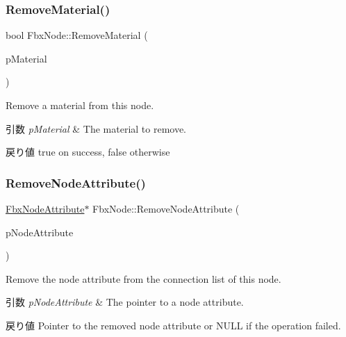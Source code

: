 \subsubsection{\texorpdfstring{Remove\+Material()}{RemoveMaterial()}}
{\footnotesize\ttfamily bool Fbx\+Node\+::\+Remove\+Material (\begin{DoxyParamCaption}\item[{\hyperlink{class_fbx_surface_material}{Fbx\+Surface\+Material} $\ast$}]{p\+Material }\end{DoxyParamCaption})}

Remove a material from this node. 
\begin{DoxyParams}{引数}
{\em p\+Material} & The material to remove. \\
\hline
\end{DoxyParams}
\begin{DoxyReturn}{戻り値}
true on success, false otherwise 
\end{DoxyReturn}
\mbox{\label{class_fbx_node_a2ec597897a0eba7c5efbc3f381dbeb72}} 
\subsubsection{\texorpdfstring{Remove\+Node\+Attribute()}{RemoveNodeAttribute()}}
{\footnotesize\ttfamily \hyperlink{class_fbx_node_attribute}{Fbx\+Node\+Attribute}$\ast$ Fbx\+Node\+::\+Remove\+Node\+Attribute (\begin{DoxyParamCaption}\item[{\hyperlink{class_fbx_node_attribute}{Fbx\+Node\+Attribute} $\ast$}]{p\+Node\+Attribute }\end{DoxyParamCaption})}

Remove the node attribute from the connection list of this node. 
\begin{DoxyParams}{引数}
{\em p\+Node\+Attribute} & The pointer to a node attribute. \\
\hline
\end{DoxyParams}
\begin{DoxyReturn}{戻り値}
Pointer to the removed node attribute or {\ttfamily N\+U\+LL} if the operation failed. 
\end{DoxyReturn}
\mbox{\label{class_fbx_node_a76253e3586deb4a9c3d4199d8c095438}} 
